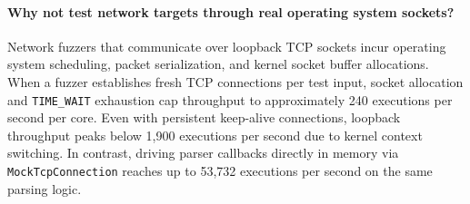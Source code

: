 \paragraph{Why not test network targets through real operating system sockets?}
Network fuzzers that communicate over loopback TCP sockets incur operating system scheduling, packet serialization, and kernel socket buffer allocations.
When a fuzzer establishes fresh TCP connections per test input, socket allocation and \texttt{TIME\_WAIT} exhaustion cap throughput to approximately 240 executions per second per core.
Even with persistent keep-alive connections, loopback throughput peaks below 1{,}900 executions per second due to kernel context switching.
In contrast, driving parser callbacks directly in memory via \texttt{MockTcpConnection} reaches up to 53{,}732 executions per second on the same parsing logic.
